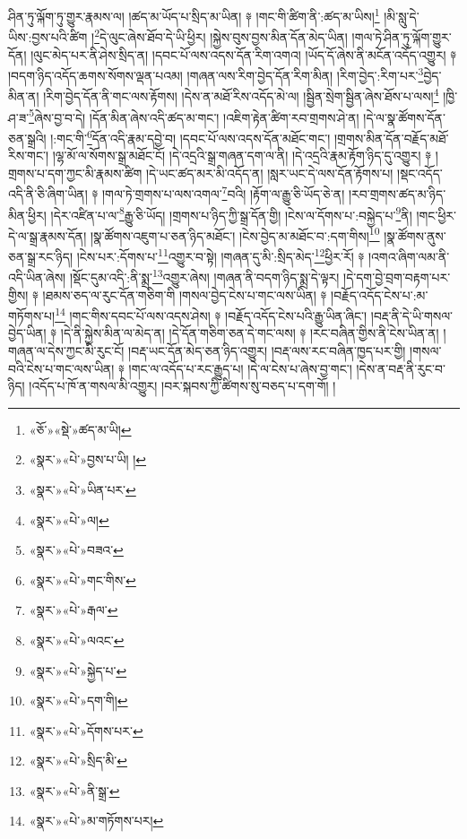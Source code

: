 ཤིན་ཏུ་ལྐོག་ཏུ་གྱུར་རྣམས་ལ། །ཚད་མ་ཡོད་པ་སྲིད་མ་ཡིན། ༈ །གང་གི་ཚིག་ནི་:ཚད་མ་ཡིས།\footnote{«ཅོ་»«སྡེ་»ཚད་མ་ཡི།} །མི་སླུ་དེ་ཡིས་:བྱས་པའི་ཚིག །\footnote{«སྣར་»«པེ་»བྱས་པ་ཡི། །}དེ་ལུང་ཞེས་ཐོབ་དེ་ཡི་ཕྱིར། །སྐྱེས་བུས་བྱས་མིན་དོན་མེད་ཡིན། །གལ་ཏེ་ཤིན་ཏུ་ལྐོག་གྱུར་དོན། །ལུང་མེད་པར་ནི་ཤེས་སྲིད་ན། །དབང་པོ་ལས་འདས་དོན་རིག་འགའ། །ཡོད་དོ་ཞེས་ནི་མངོན་འདོད་འགྱུར། ༈ །བདག་ཉིད་འདོད་ཆགས་སོགས་ལྡན་པའམ། །གཞན་ལས་རིག་བྱེད་དོན་རིག་མིན། །རིག་བྱེད་:རིག་པར་\footnote{«སྣར་»«པེ་»ཡིན་པར་}བྱེད་མིན་ན། །རིག་བྱེད་དོན་ནི་གང་ལས་རྟོགས། །དེས་ན་མཐོ་རིས་འདོད་མེ་ལ། །སྦྱིན་སྲེག་སྦྱིན་ཞེས་ཐོས་པ་ལས།\footnote{«སྣར་»«པེ་»ལ།} །ཁྱི་ཤ་ཟ་\footnote{«སྣར་»«པེ་»བཟའ་}ཞེས་བྱ་བ་དེ། །དོན་མིན་ཞེས་འདི་ཚད་མ་གང་། །འཇིག་རྟེན་ཚིག་རབ་གྲགས་ཤེ་ན། །དེ་ལ་སྣ་ཚོགས་དོན་ཅན་སྒྲའི། །:གང་གི་\footnote{«སྣར་»«པེ་»གང་གིས་}དོན་འདི་རྣམ་དབྱེ་བ། །དབང་པོ་ལས་འདས་དོན་མཐོང་གང་། །གྲགས་མིན་དོན་བརྗོད་མཐོ་རིས་གང་། །ལྷ་མོ་ལ་སོགས་སྒྲ་མཐོང་ངོ། །དེ་འདྲའི་སྒྲ་གཞན་དག་ལ་ནི། །དེ་འདྲའི་རྣམ་རྟོག་ཉིད་དུ་འགྱུར། ༈ །གྲགས་པ་དག་ཀྱང་མི་རྣམས་ཚིག །དེ་ཡང་ཚད་མར་མི་འདོད་ན། །སླར་ཡང་དེ་ལས་དོན་རྟོགས་པ། །སྡང་འདོད་འདི་ནི་ཅི་ཞིག་ཡིན། ༈ །གལ་ཏེ་གྲགས་པ་ལས་འགལ་\footnote{«སྣར་»«པེ་»རྒལ་}བའི། །རྟོག་ལ་རྒྱུ་ཅི་ཡོད་ཅེ་ན། །རབ་གྲགས་ཚད་མ་ཉིད་མིན་ཕྱིར། །དེར་འཛིན་པ་ལ་\footnote{«སྣར་»«པེ་»ལའང་}རྒྱུ་ཅི་ཡོད། །གྲགས་པ་ཉིད་ཀྱི་སྒྲ་དོན་གྱི། །ངེས་ལ་དོགས་པ་:བསྐྱེད་པ་\footnote{«སྣར་»«པེ་»སྐྱེད་པ་}ནི། །གང་ཕྱིར་དེ་ལ་སྒྲ་རྣམས་དོན། །སྣ་ཚོགས་འཇུག་པ་ཅན་ཉིད་མཐོང་། །ངེས་བྱེད་མ་མཐོང་བ་:དག་གིས།\footnote{«སྣར་»«པེ་»དག་གི།} །སྣ་ཚོགས་ནུས་ཅན་སྒྲ་རང་ཉིད། །ངེས་པར་:དོགས་པ་\footnote{«སྣར་»«པེ་»དོགས་པར་}འགྱུར་བ་སྟེ། །གཞན་དུ་མི་:སྲིད་མེད་\footnote{«སྣར་»«པེ་»སྲིད་མི་}ཕྱིར་རོ། ༈ །འགའ་ཞིག་ལམ་ནི་འདི་ཡིན་ཞེས། །སྡོང་དུམ་འདི་:ནི་སྨྲ་\footnote{«སྣར་»«པེ་»ནི་སྒྲ་}འགྱུར་ཞེས། །གཞན་ནི་བདག་ཉིད་སྨྲ་དེ་ལྟར། །དེ་དག་བྱེ་བྲག་བརྟག་པར་གྱིས། ༈ །ཐམས་ཅད་ལ་རུང་དོན་གཅིག་གི །གསལ་བྱེད་ངེས་པ་གང་ལས་ཡིན། ༈ །བརྗོད་འདོད་ངེས་པ་:མ་གཏོགས་པ།\footnote{«སྣར་»«པེ་»མ་གཏོགས་པར།} །གང་གིས་དབང་པོ་ལས་འདས་ཤེས། ༈ །བརྗོད་འདོད་ངེས་པའི་རྒྱུ་ཡིན་ཞིང་། །བརྡ་ནི་དེ་ཡི་གསལ་བྱེད་ཡིན། ༈ །དེ་ནི་སྐྱེས་མིན་ལ་མེད་ན། །དེ་དོན་གཅིག་ཅན་དེ་གང་ལས། ༈ །རང་བཞིན་གྱིས་ནི་ངེས་ཡིན་ན། །གཞན་ལ་དེས་ཀྱང་མི་རུང་ངོ། །བརྡ་ཡང་དོན་མེད་ཅན་ཉིད་འགྱུར། །བརྡ་ལས་རང་བཞིན་ཁྱད་པར་གྱི། །གསལ་བའི་ངེས་པ་གང་ལས་ཡིན། ༈ །གང་ལ་འདོད་པ་རང་རྒྱུད་པ། །དེ་ལ་ངེས་པ་ཞེས་བྱ་གང་། །དེས་ན་བརྡ་ནི་རུང་བ་ཉིད། །འདོད་པ་ཁོ་ན་གསལ་མི་འགྱུར། །བར་སྐབས་ཀྱི་ཚིགས་སུ་བཅད་པ་དག་གོ། །
